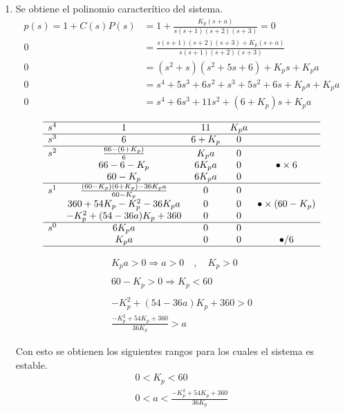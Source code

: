 \renewcommand{\theenumi}{\large\bfseries\alph{enumi}}

\begin{ejercicio}
  \begin{enumerate}
    \item 
    Se obtiene el polinomio caracterítico del sistema.
    \begin{align*}
      p(s) = 1+C(s)P(s) &= 1+\frac{K_p(s+a)}{s(s+1)(s+2)(s+3)} = 0
      \\
      0 &= \frac{s(s+1)(s+2)(s+3)+K_p(s+a)}{s(s+1)(s+2)(s+3)}
      \\
      0 &= (s^2+s)(s^2+5s+6)+K_ps+K_pa
      \\
      0 &= s^4+5s^3+6s^2+s^3+5s^2+6s+K_ps+K_pa
      \\
      0 &= s^4+6s^3+11s^2+(6+K_p)s+K_pa
    \end{align*}

\renewcommand{\arraystretch}{1.5}
  \[
    \begin{matrix}
    \hline
    s^4 & 1 & 11 & K_p a
    \\\hline
    s^3 & 6 & 6+K_p & 0
    \\\hline
    s^2 & \frac{66-(6+K_p)}{6} & K_p a & 0
    \\
     & 66-6-K_p & 6K_p a & 0 & \bullet \times 6
    \\
     & 60-K_p & 6K_p a & 0
    \\\hline
    s^1 & \frac{(60-K_p)(6+K_p)-36K_p a}{60-K_p} & 0 & 0 
    \\
     & 360+54K_p-K_p^2 - 36K_p a & 0 & 0 & \bullet \times(60-K_p)
    \\
     & -K_p^2 + (54-36a)K_p + 360 & 0 & 0
    \\\hline
    s^0 & 6K_p a & 0 & 0
    \\
     & K_p a & 0 & 0 & \bullet / 6
    \\\hline
    \end{matrix}
  \]

  \begin{align*}
    K_p a > 0 \Rightarrow a > 0 \quad,\quad K_p > 0
    \\
    \\
    60-K_p > 0 \Rightarrow K_p < 60
    \\
    \\
    -K_p^2+(54-36a)K_p+360 > 0
    \\
    \frac{-K_p^2+54K_p+360}{36K_p} > a
  \end{align*}

  Con esto se obtienen los siguientes rangos para los cuales el sistema es estable.
  \begin{align*}
    0 < K_p < 60
    \\
    0 < a < \frac{-K_p^2+54K_p+360}{36K_p}
  \end{align*}


\end{enumerate}
\end{ejercicio}
